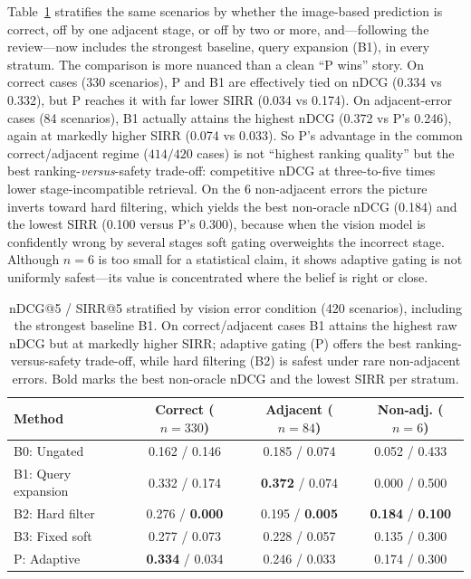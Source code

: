 \documentclass[conference]{IEEEtran}
\begin{document}
Table~\ref{tab:strat} stratifies the same scenarios by whether the image-based prediction is correct, off by one adjacent stage, or off by two or more, and---following the review---now includes the strongest baseline, query expansion (B1), in every stratum. The comparison is more nuanced than a clean ``P wins'' story. On correct cases (330 scenarios), P and B1 are effectively tied on nDCG (0.334 vs 0.332), but P reaches it with far lower SIRR (0.034 vs 0.174). On adjacent-error cases (84 scenarios), B1 actually attains the highest nDCG (0.372 vs P's 0.246), again at markedly higher SIRR (0.074 vs 0.033). So P's advantage in the common correct/adjacent regime ($414/420$ cases) is not ``highest ranking quality'' but the best ranking-\emph{versus}-safety trade-off: competitive nDCG at three-to-five times lower stage-incompatible retrieval. On the 6 non-adjacent errors the picture inverts toward hard filtering, which yields the best non-oracle nDCG (0.184) and the lowest SIRR (0.100 versus P's 0.300), because when the vision model is confidently wrong by several stages soft gating overweights the incorrect stage. Although $n=6$ is too small for a statistical claim, it shows adaptive gating is not uniformly safest---its value is concentrated where the belief is right or close.

\begin{table}[t]
\centering
\caption{nDCG@5 / SIRR@5 stratified by vision error condition (420 scenarios), including the strongest baseline B1. On correct/adjacent cases B1 attains the highest raw nDCG but at markedly higher SIRR; adaptive gating (P) offers the best ranking-versus-safety trade-off, while hard filtering (B2) is safest under rare non-adjacent errors. Bold marks the best non-oracle nDCG and the lowest SIRR per stratum.}
\label{tab:strat}
\small
\begin{tabular}{lccc}
\toprule
\textbf{Method} & \textbf{Correct ($n{=}330$)} & \textbf{Adjacent ($n{=}84$)} & \textbf{Non-adj. ($n{=}6$)} \\
\midrule
B0: Ungated & 0.162 / 0.146 & 0.185 / 0.074 & 0.052 / 0.433 \\
B1: Query expansion & 0.332 / 0.174 & \textbf{0.372} / 0.074 & 0.000 / 0.500 \\
B2: Hard filter & 0.276 / \textbf{0.000} & 0.195 / \textbf{0.005} & \textbf{0.184} / \textbf{0.100} \\
B3: Fixed soft & 0.277 / 0.073 & 0.228 / 0.057 & 0.135 / 0.300 \\
P: Adaptive & \textbf{0.334} / 0.034 & 0.246 / 0.033 & 0.174 / 0.300 \\
\bottomrule
\end{tabular}
\end{table}
\end{document}
